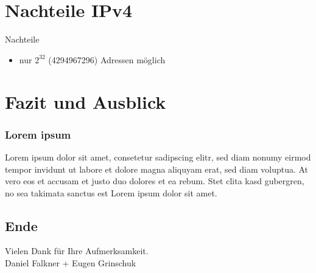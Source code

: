 \documentclass[xcolor=dvipsnames]{beamer}
\newcommand*{\Author}{Daniel Falkner + Eugen Grinschuk} %
\begin{document}
\section{Nachteile IPv4}
\begin{frame}
  \begin{alertblock}{Nachteile}
	  \begin{itemize}
  		\item nur $2^{32}$ (4294967296) Adressen möglich
	  \end{itemize}
  \end{alertblock}
\end{frame}

\section{Fazit und Ausblick}
\begin{frame}
 \frametitle{Lorem ipsum}
  Lorem ipsum dolor sit amet, consetetur sadipscing elitr, sed diam nonumy eirmod tempor invidunt ut labore et dolore magna aliquyam erat, sed diam voluptua. At vero eos et accusam et justo duo dolores et ea rebum. Stet clita kasd gubergren, no sea takimata sanctus est Lorem ipsum dolor sit amet.
\end{frame}

\subsection*{Ende}
\begin{frame}
	\begin{block}{}	
		\begin{center}
			Vielen Dank für Ihre Aufmerksamkeit. \\
			\Author{}
		\end{center}	
	\end{block}
\end{frame}
\end{document}
